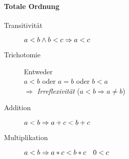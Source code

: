 \paragraph{Totale Ordnung}

\begin{description}
      \item [Transitivität]
            $\linebreak a < b \land b < c \Rightarrow a < c$

      \item [Trichotomie] Entweder \\
            $a < b$ oder $a = b$ oder $b < a$ \\
            $\Rightarrow$ \emph{Irreflexivität} ($a < b \Rightarrow a \neq b$)

      \item [Addition]
            $\linebreak a < b \Rightarrow a + c < b + c$

      \item [Multiplikation]
            $\linebreak a < b \Rightarrow a * c < b * c \quad 0 < c$
\end{description}

% 
% 
% 

